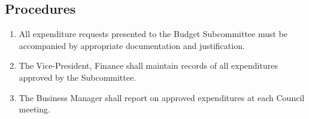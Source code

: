 \subsection{Procedures}
\begin{enumerate}
    \item All expenditure requests presented to the Budget Subcommittee must be accompanied by appropriate documentation and justification.
    \item The Vice-President, Finance shall maintain records of all expenditures approved by the Subcommittee.
    \item The Business Manager shall report on approved expenditures at each Council meeting.
\end{enumerate}
